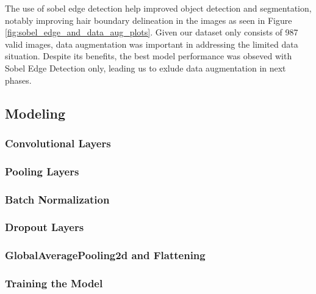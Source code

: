 The use of sobel edge detection help improved object detection and segmentation, notably improving hair boundary delineation in the images as seen in Figure \ref{fig:sobel_edge_and_data_aug_plots}. Given our dataset only consists of 987 valid images, data augmentation was important in addressing the limited data situation. Despite its benefits, the best model performance was obseved with Sobel Edge Detection only, leading us to exlude data augmentation in next phases.

\subsection{Modeling}

\subsubsection{Convolutional Layers}


\subsubsection{Pooling Layers}

\subsubsection{Batch Normalization}

\subsubsection{Dropout Layers}

\subsubsection{GlobalAveragePooling2d and Flattening}



\subsubsection{Training the Model}


